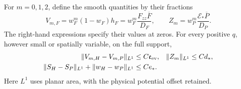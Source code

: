 \begin{lemma}
\label{lem:regularized-poles}
For $m=0,1,2$, define the smooth quantities by their fractions
\begin{equation}
 V_{m,F}=w_F^m(1-w_F)h_F
       =w_F^m\frac{F_{zz}\overline F}{D_F},\qquad
 Z_m=w_P^m\frac{\mathcal E_*\overline P}{D_P}.
 \label{eq:positive-regularized-poles}
\end{equation}
The right-hand expressions specify their values at zeros. For every
positive $q$, however small or spatially variable, on the full support,
\begin{align}
 \|V_{m,H}-V_{m,P}\|_{L^1}&\le C\mathfrak e_{\rm ev},&
 \|Z_m\|_{L^1}&\le Cd_*,\notag\\
 \|S_H-S_P\|_{L^1}+\|w_H-w_P\|_{L^1}&\le Ce_*.
 \label{eq:positive-pole-L1}
\end{align}
Here $L^1$ uses planar area, with the physical potential offset retained.
\end{lemma}
